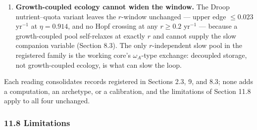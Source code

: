 \documentclass[11pt]{article}
\begin{document}
\begin{enumerate}
  suppression approaches zero asymptotically, reaching \(N < 1\) near
  time \(430\) (Section 8.3). Local spectra cannot see the extraction
  form; the excursion record can.
\item
  \textbf{Growth-coupled ecology cannot widen the window.} The Droop
  nutrient--quota variant leaves the \(r\)-window unchanged --- upper
  edge \(\le 0.023\) yr\(^{-1}\) at \(\eta = 0.914\), and no Hopf
  crossing at any \(r \ge 0.2\) yr\(^{-1}\) --- because a growth-coupled
  pool self-relaxes at exactly \(r\) and cannot supply the slow
  companion variable (Section 8.3). The only \(r\)-independent slow pool
  in the registered family is the working core's \(\omega_A\)-type
  exchange: decoupled storage, not growth-coupled ecology, is what can
  slow the loop.
\end{enumerate}

Each reading consolidates records registered in Sections 2.3, 9, and
8.3; none adds a computation, an archetype, or a calibration, and the
limitations of Section 11.8 apply to all four unchanged.

\subsubsection{11.8 Limitations}\label{limitations}
\end{document}
